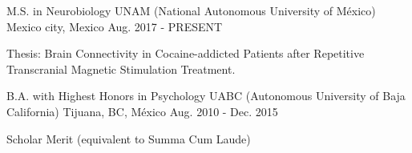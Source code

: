 \begin{cventries}
    \cventry
        {M.S. in Neurobiology}
        {UNAM (National Autonomous University of México)}
        {Mexico city, Mexico}
        {Aug. 2017 - PRESENT}
        {
            \begin{cvitems}
                \item {Thesis: Brain Connectivity in Cocaine-addicted Patients after Repetitive Transcranial Magnetic Stimulation Treatment.}
            \end{cvitems}
        }
    \cventry
        {B.A. with Highest Honors in Psychology}
        {UABC (Autonomous University of Baja California)}
        {Tijuana, BC, México}
        {Aug. 2010 - Dec. 2015}
        {
            \begin{cvitems}
                \item {Scholar Merit (equivalent to Summa Cum Laude)}
            \end{cvitems}
        }
\end{cventries}
